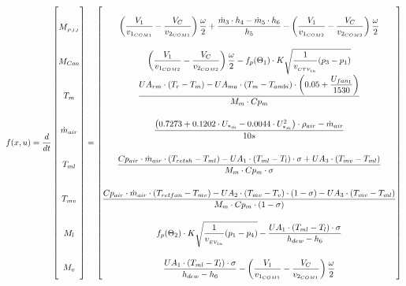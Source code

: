 \begin{equation} \label{eq:f_Sub} \renewcommand{\arraystretch}{3.4}
	f(x,u) =   \dfrac{d}{dt} \begin{bmatrix}
		M_{_{PJJ}}		\\				%
		M_{Con} 		\\				%
		T_m 			\\				%
		\dot{m}_{air}	\\				%
		T_{ml}			\\				%
		T_{mv}			\\				%
		M_l				\\				%
		M_v				\\				%
	\end{bmatrix}
	=
	\begin{bmatrix}
		\left(\dfrac{V_1}{v_{1_{COM1}}} - \dfrac{V_C}{v_{2_{COM1}}}\right) \dfrac{\omega}{2} + \dfrac{\dot{m}_{3} \cdot h_4 - \dot{m}_{5} \cdot h_6}{h_5} - \left(\dfrac{V_1}{v_{1_{COM2}}} - \dfrac{V_C}{v_{2_{COM2}}}\right) \dfrac{\omega}{2} \\										%
		\left(\dfrac{V_1}{v_{1_{COM2}}} - \dfrac{V_C}{v_{2_{COM2}}}\right) \dfrac{\omega}{2} - f_p(\Theta_1) \cdot K  \sqrt{\dfrac{1}{v_{_{CTV_{in}}}} (p_{3} - p_{1})}	\\												%
		\dfrac{U A_{rm} \cdot (T_r - T_m) - U A_{ma} \cdot (T_m - T_{ambi})\cdot \left(0.05 + \dfrac{U_{fan_1}}{1530}\right)}{M_m \cdot Cp_m} \\									%
		\dfrac{\left( 0.7273 + 0.1202 \cdot U_{*_{\dot{m}}}  -0.0044 \cdot	U_{*_{\dot{m}}}^2 \right) \cdot \rho_{air}  - \dot{m}_{air}} {10s}		\\					%
		\dfrac{Cp_{air} \cdot \dot{m}_{air} \cdot (T_{retsh} - T_{ml})-U A_1 \cdot (T_{ml} - T_l) \cdot \sigma + U A_3 \cdot (T_{mv} - T_{ml})}{M_m \cdot Cp_m \cdot \sigma}        \\	%
		\dfrac{Cp_{air} \cdot \dot{m}_{air} \cdot (T_{retfan} - T_{mv}) - U A_2 \cdot (T_{mv} - T_v) \cdot (1- \sigma) - U A_3 \cdot (T_{mv} - T_{ml})}{M_m \cdot Cp_m \cdot (1- \sigma)}	\\	%
		f_p(\Theta_2) \cdot K  \sqrt{\dfrac{1}{v_{_{EV_{in}}}} (p_{1} - p_{4})} - \dfrac{U A_1 \cdot (T_{ml} - T_l) \cdot \sigma}{h_{dew} - h_{6}}		\\											%
		\dfrac{U A_1 \cdot (T_{ml} - T_l) \cdot \sigma}{h_{dew} - h_{6}} - \left(\dfrac{V_1}{v_{1_{COM1}}} - \dfrac{V_C}{v_{2_{COM1}}}\right) \dfrac{\omega}{2}	\\												%
	\end{bmatrix}
\end{equation}





